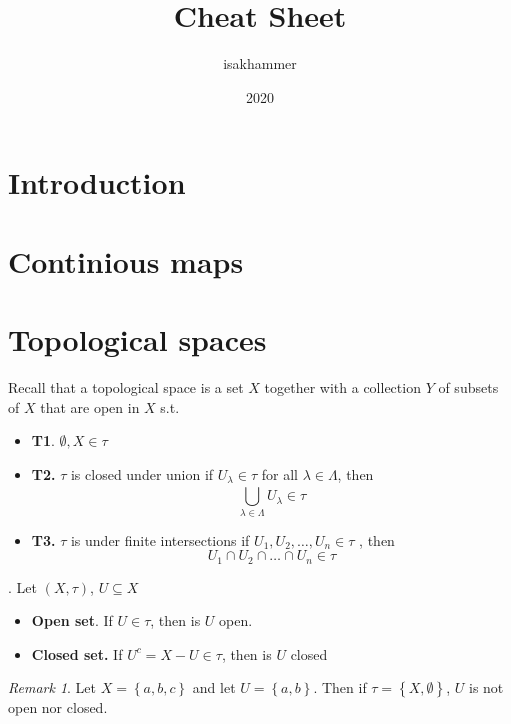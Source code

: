 \documentclass{article}
\title{Cheat Sheet}
\author{isakhammer }
\date{2020}
\theoremstyle{remark}
\newtheorem*{remark}{Remark}
\begin{document}
\maketitle

\section{ Introduction}%
\label{sec:Ch1}

\section{ Continious maps}%
\label{sec:continious_maps}

\section{ Topological spaces}%
\label{sec:Ch3}

\begin{definition} Recall that a topological space is a set $X$ together with a collection $Y$ of subsets
    of $X$ that are open in $X$ s.t.
    \begin{itemize}
        \item \textbf{T1}.  $ \emptyset , X \in  \tau $
        \item \textbf{T2.} $ \tau $ is closed under union if $U_{\lambda } \in  \tau $ for all $\lambda  \in \Lambda $, then \[
                \bigcup_{\lambda  \in  \Lambda }^{} U_{\lambda } \in \tau
        \]
    \item \textbf{T3.} $\tau  $ is under finite intersections if $U_{1}, U_{2}, \ldots, U_{n} \in \tau $ , then \[
    U_{1} \cap U_{2} \cap \ldots \cap  U_{n} \in \tau
    \]

    \end{itemize}
\end{definition}

\begin{definition}
    . Let $\left( X, \tau  \right)$, $U \subseteq X$
    \begin{itemize}
        \item
\textbf{Open set}.  If $ U \in \tau $, then is $U$ open.
    \item \textbf{Closed set.}  If $U^{c} = X- U \in \tau $, then is $U$ closed
    \end{itemize}
\end{definition}


\begin{remark}
Let $X = \left\{ a,b,c \right\}$ and let $U = \left\{ a,b \right\}$. Then if $\tau = \left\{ X, \emptyset  \right\}$,
$U$ is not open nor closed.
\end{remark}
\end{document}
